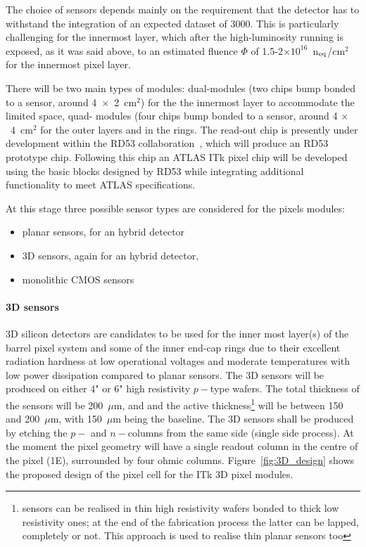The choice of sensors depends mainly on the requirement that the detector has to withstand the integration of an expected dataset  of 3000\invfb.  This is particularly challenging for the innermost layer, which after the high-luminosity running is exposed, as it was said above, to an estimated fluence $\Phi$ of 1.5-2$\times10^{16}$~n$_{\rm eq}$/cm$^2$ for the innermost pixel layer. 

There will be two main types of modules: dual-modules (two chips bump bonded to a sensor, around 
4~$\times$~2~cm$^2$) for the the innermost layer to accommodate the limited space, quad- modules (four 
chips bump bonded to a sensor, around 4 $\times$~4~cm$^2$ for the outer layers and in the rings. 
The read-out chip is presently under development within the RD53 collaboration~\cite{RD53}, 
which will produce an RD53 prototype chip. Following this chip an ATLAS ITk pixel chip will be developed 
using the basic blocks designed by RD53 while integrating additional functionality to meet ATLAS 
specifications.

At this stage three possible sensor types are considered for the pixels modules:

\begin{itemize}
\item planar sensors, for an hybrid detector
\item 3D sensors, again for an hybrid detector,
\item monolithic CMOS sensors
\end{itemize}

\paragraph{3D sensors}
3D silicon detectors are candidates to be used for the inner most layer(s) of the barrel pixel system and 
some of the inner end-cap rings due to their excellent radiation hardness at low operational voltages and 
moderate temperatures with low power dissipation compared to planar sensors.
The 3D sensors will be produced on either 4" or 6" high resistivity $p-$type wafers. 
The total thickness of the sensors will be 200~$\mu$m, and and the active thickness\footnote{sensors can be realised in thin high resistivity wafers bonded to thick low resistivity ones; at the end of the fabrication process the latter can be lapped, completely or not. This approach is used to realise thin planar sensors too} will be between 
150 and 200~$\mu$m, with 150~$\mu$m being the baseline. 
The 3D sensors shall be produced by etching the $p-$ and $n-$columns from the same side (single side process). At the moment the pixel geometry will have a single readout column in the centre of the pixel (1E), surrounded by four ohmic columns. Figure~\ref{fig:3D_design} shows the proposed design of the pixel 
cell for the ITk 3D pixel modules. 


